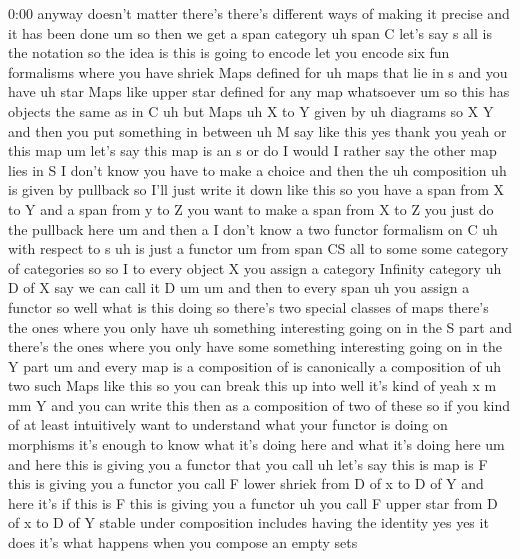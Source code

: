 \begin{unfinished}{0:00}
anyway  doesn't  matter  there's  there's
different  ways  of  making  it  precise  and
it  has  been  done  um  so  then  we  get  a
span  category  uh  span  C  let's  say  s  all
is  the  notation  so  the  idea  is  this  is
going  to  encode  let  you  encode  six  fun
formalisms  where  you  have  shriek  Maps
defined  for  uh  maps  that  lie  in  s  and
you  have  uh  star  Maps  like  upper  star
defined  for  any  map  whatsoever  um  so
this  has
objects  the  same  as  in
C  uh  but
Maps  uh  X  to  Y  given
by  uh
diagrams  so  X
Y  and  then  you  put  something  in  between
uh  M  say  like
this  yes  thank  you  yeah  or  this  map  um
let's  say  this  map  is  an
s  or  do  I  would  I  rather  say  the  other
map  lies  in  S  I  don't  know
you  have  to  make  a
choice  and  then  the  uh
composition  uh  is  given  by  pullback  so
I'll  just  write  it  down  like
this  so  you  have  a  span  from  X  to  Y  and
a  span  from  y  to  Z  you  want  to  make  a
span  from  X  to  Z  you  just  do  the
pullback
here
um  and  then  a  I  don't  know  a  two  functor
formalism  on
C  uh  with  respect  to  s  uh  is  just  a
functor  um  from  span
CS  all
to  some  some  category  of  categories
so  so  I  to  every  object  X  you  assign  a
category  Infinity
category  uh  D  of  X  say  we  can  call  it  D
um  um  and  then  to  every
span
uh  you  assign  a
functor
so  well  what  is  this  doing  so  there's
two  special  classes  of
maps  there's  the  ones  where  you  only
have  uh  something  interesting  going  on
in  the  S  part  and  there's  the  ones  where
you  only  have  some  something  interesting
going  on  in  the  Y
part
um  and  every  map  is  a  composition  of  is
canonically  a  composition  of  uh  two  such
Maps  like  this  so  you  can  break  this  up
into  well  it's  kind  of  yeah  x  m  mm  Y  and
you  can  write  this  then  as  a  composition
of  two  of  these  so  if  you  kind  of  at
least  intuitively  want  to  understand
what  your  functor  is  doing  on  morphisms
it's  enough  to  know  what  it's  doing  here
and  what  it's  doing  here  um  and  here
this  is  giving  you  a  functor  that  you
call  uh  let's  say  this  is  map  is  F  this
is  giving  you  a  functor  you  call  F  lower
shriek  from  D  of  x  to  D  of  Y  and  here
it's  if  this  is  F  this  is  giving  you  a
functor  uh  you  call  F  upper  star  from  D
of  x  to  D  of
Y
stable  under  composition  includes  having
the  identity  yes  yes  it  does  it's  what
happens  when  you  compose  an  empty  sets

\end{unfinished}
